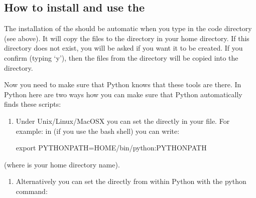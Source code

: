 \documentclass[letterpaper,10pt,english]{sphinxmanual}
\begin{document}
\subsection{How to install and use the }
\label{\detokenize{installation:how-to-install-and-use-the-python-radmc3d-tools}}
The installation of the  should be automatic when you
type  in the  code directory (see
above). It will copy the files to the 
directory in your home directory. If this directory does not exist, you
will be asked if you want it to be created. If you confirm (typing ‘y’),
then the files from the  directory will be
copied into the  directory.

Now you need to make sure that Python knows that these tools are there.
In Python here are two ways how you can make sure that Python automatically
finds these scripts:
\begin{enumerate}
%
\item {} 
Under Unix/Linux/MacOSX you can set the  directly in your
 file. For example: in
 (if you use the bash shell) you can write:

\begin{sphinxVerbatim}[commandchars=\\\{\}]
export PYTHONPATH=\PYGZdl{}HOME/bin/python:\PYGZdl{}PYTHONPATH
\end{sphinxVerbatim}

\end{enumerate}

(where  is your home directory name).
\begin{enumerate}
%
\item {} 
Alternatively you can set the  directly from within
Python with the python command:

\begin{sphinxVerbatim}[commandchars=\\\{\}]
 
 
  \PYG{p}{[}\PYG{p}{]}
\end{sphinxVerbatim}

\end{enumerate}
\end{document}
